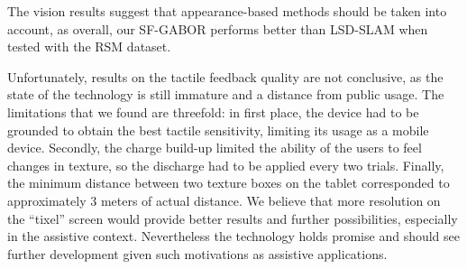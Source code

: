 The vision results suggest that appearance-based methods should be taken into account, as overall, our SF-GABOR performs better than LSD-SLAM when tested with the RSM dataset.

Unfortunately, results on the tactile feedback quality are not conclusive, as the state of the technology is still immature and a distance from public usage. The limitations that we found are threefold: in first place, the device had to be grounded to obtain the best tactile sensitivity, limiting its usage as a mobile device. Secondly, the charge build-up limited the ability of the users to feel changes in texture, so the discharge had to be applied every two trials. Finally, the minimum distance between two texture boxes on the tablet corresponded to approximately 3 meters of actual distance. We believe that more resolution on the ``tixel'' screen would provide better results and further possibilities, especially in the assistive context. Nevertheless the technology holds promise and should see further development given such motivations as assistive applications.
